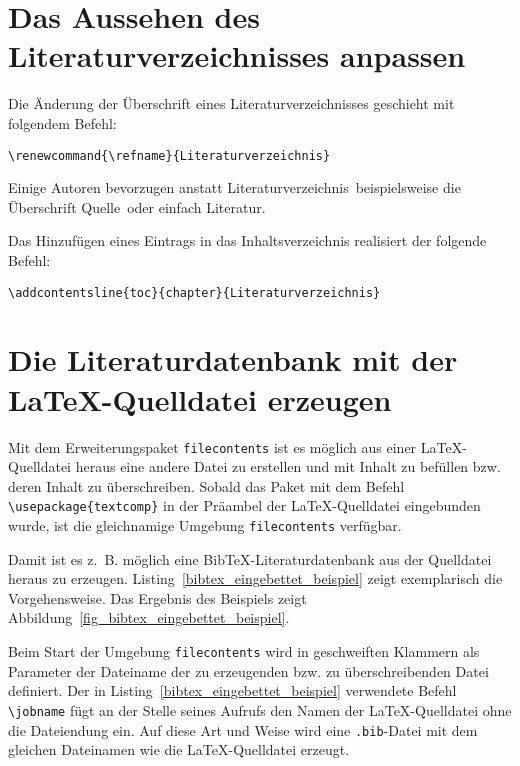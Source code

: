 \section{Das Aussehen des Literaturverzeichnisses anpassen}
\label{Abschnitt_Literaturverzeichnis_anpassen}

Die Änderung der Überschrift eines Literaturverzeichnisses geschieht mit folgendem Befehl:

\begin{boxedminipage}{\textwidth}
\texttt{\textbackslash renewcommand\{\textbackslash refname\}\{Literaturverzeichnis\}}
\end{boxedminipage}

Einige Autoren bevorzugen anstatt \glqq Literaturverzeichnis\grqq\ beispielsweise die Überschrift \glqq Quelle\grqq\ oder einfach \grqq Literatur\grqq.

Das Hinzufügen eines Eintrags in das Inhaltsverzeichnis realisiert der folgende Befehl:


\begin{boxedminipage}{\textwidth}
\texttt{\textbackslash addcontentsline\{toc\}\{chapter\}\{Literaturverzeichnis\}}
\end{boxedminipage}




\section{Die Literaturdatenbank mit der \LaTeX-Quelldatei erzeugen}
\label{Abschnitt_Literaturdatenbank_Quelldatei_erzeugen}

Mit dem Erweiterungspaket \verb|filecontents| ist es möglich aus einer \LaTeX-Quelldatei heraus eine andere Datei zu erstellen und mit Inhalt zu befüllen bzw. deren Inhalt zu überschreiben. Sobald das Paket mit dem Befehl \verb!\usepackage{textcomp}! in der Präambel der \LaTeX-Quelldatei eingebunden wurde, ist die gleichnamige Umgebung \verb|filecontents| verfügbar.

Damit ist es z.~B. möglich eine Bib\TeX-Literaturdatenbank aus der Quelldatei heraus zu erzeugen.
Listing~\ref{bibtex_eingebettet_beispiel} zeigt exemplarisch die Vorgehensweise. Das Ergebnis des
Beispiels zeigt Abbildung~\ref{fig_bibtex_eingebettet_beispiel}.

Beim Start der Umgebung \verb|filecontents| wird in geschweiften Klammern als Parameter der Dateiname der zu erzeugenden bzw. zu überschreibenden Datei definiert. Der in Listing~\ref{bibtex_eingebettet_beispiel} verwendete Befehl \verb|\jobname| fügt an der Stelle seines Aufrufs den Namen der \LaTeX-Quelldatei ohne die Dateiendung ein. Auf diese Art und Weise wird eine \verb|.bib|-Datei mit dem gleichen Dateinamen wie die \LaTeX-Quelldatei erzeugt.

